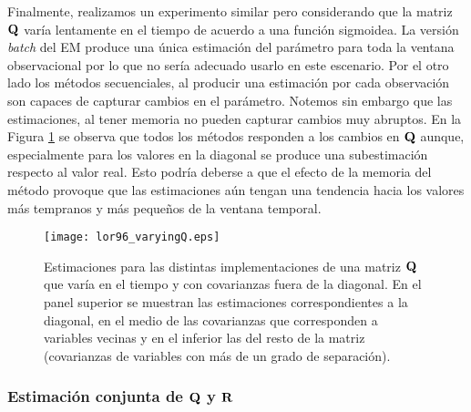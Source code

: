Finalmente, realizamos un experimento similar pero considerando que la matriz $\mathbf{Q}$ varía lentamente en el tiempo de acuerdo a una función sigmoidea. La versión \textit{batch} del EM produce una única estimación del parámetro para toda la ventana observacional por lo que no sería adecuado usarlo en este escenario. Por el otro lado los métodos secuenciales, al producir una estimación por cada observación son capaces de capturar cambios en el parámetro. Notemos sin embargo que las estimaciones, al tener memoria no pueden capturar cambios muy abruptos. En la Figura \ref{fig:lor96_varyingQ} se observa que todos los métodos responden a los cambios en $\mathbf{Q}$ aunque, especialmente para los valores en la diagonal se produce una subestimación respecto al valor real. Esto podría deberse a que el efecto de la memoria del método provoque que las estimaciones aún tengan una tendencia hacia los valores más tempranos y más pequeños de la ventana temporal. 
\begin{figure}[h]
    \centering
    \texttt{[image: lor96\_varyingQ.eps]}
    \caption{Estimaciones para las distintas implementaciones de una matriz $\mathbf{Q}$ que varía en el tiempo y con covarianzas fuera de la diagonal. En el panel superior se muestran las estimaciones correspondientes a la diagonal, en el medio de las covarianzas que corresponden a variables vecinas y en el inferior las del resto de la matriz (covarianzas de variables con más de un grado de separación).}
    \label{fig:lor96_varyingQ}
\end{figure}

\subsubsection{Estimación conjunta de $\mathbf{Q}$ y $\mathbf{R}$} \

